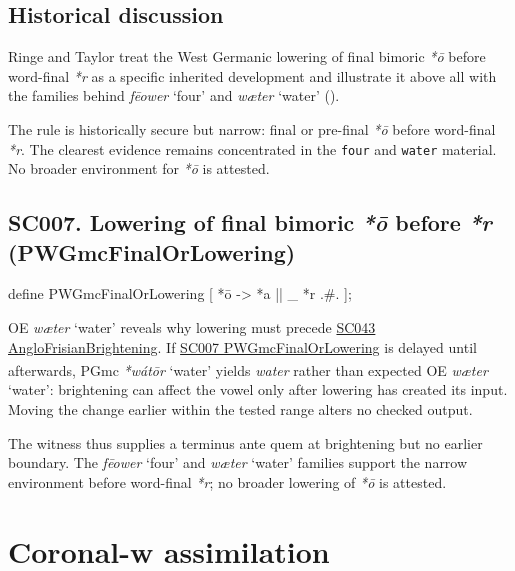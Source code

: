 \documentclass[
  british,
  a4paper,
  openany]{book}
\providecommand{\Pred}[1]{\textsuperscript{\dag}\emph{#1}}
\providecommand{\Recon}[1]{\emph{*#1}}
{\catcode`→=\active \global\def→{\ensuremath{\rightarrow}}}
\providecommand{\texorpdfstring}[2]{#1}
\DeclareRobustCommand{\CAPRRuleHeading}[2]{%
  #1\texorpdfstring{\\(#2)}{ (#2)}%
}
\providecommand{\Pred}[1]{\textsuperscript{\dag}\emph{#1}}
\providecommand{\Recon}[1]{\emph{*#1}}
{\catcode`→=\active \global\def→{\ensuremath{\rightarrow}}}
\begin{document}
\subsection{Historical discussion}\label{historical-discussion-4}

Ringe and Taylor treat the West Germanic lowering of final bimoric
\emph{*ō} before word-final \emph{*r} as a specific inherited
development and illustrate it above all with the families behind
\emph{fēower} `four' and \emph{wæter} `water'
().

The rule is historically secure but narrow: final or pre-final \emph{*ō}
before word-final \emph{*r}. The clearest evidence remains concentrated
in the \texttt{four} and \texttt{water} material. No broader environment
for \emph{*ō} is attested.

\subsection{\texorpdfstring{\CAPRRuleHeading{SC007. Lowering of final bimoric \emph{*ō} before \emph{*r}}{PWGmcFinalOrLowering}}{}}\label{rule-PWGmcFinalOrLowering}

\begin{ReaderFacingFoma}
define PWGmcFinalOrLowering [
    {*ō} -> {*a} || _ {*r} .#.
];
\end{ReaderFacingFoma}

OE \emph{wæter} `water' reveals why lowering must precede
\hyperref[rule-AngloFrisianBrightening]{SC043 AngloFrisianBrightening}.
If \hyperref[rule-PWGmcFinalOrLowering]{SC007 PWGmcFinalOrLowering} is
delayed until afterwards, PGmc \Recon{wátōr} `water' yields \Pred{water}
rather than expected OE \emph{wæter} `water': brightening can affect the
vowel only after lowering has created its input. Moving the change
earlier within the tested range alters no checked output.

The witness thus supplies a terminus ante quem at brightening but no
earlier boundary. The \emph{fēower} `four' and \emph{wæter} `water'
families support the narrow environment before word-final \emph{*r}; no
broader lowering of \emph{*ō} is attested.

\newpage

\section{Coronal-w assimilation}\label{coronal-w-assimilation}
\end{document}
